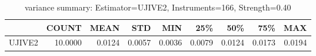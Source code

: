 \begin{table}[ht]
\centering
\caption{variance summary: Estimator=UJIVE2, Instruments=166, Strength=0.40}
\begin{tabular}{lrrrrrrrr}
\toprule
 & COUNT & MEAN & STD & MIN & 25\% & 50\% & 75\% & MAX \\
\midrule
UJIVE2 & 10.0000 & 0.0124 & 0.0057 & 0.0036 & 0.0079 & 0.0124 & 0.0173 & 0.0194 \\
\bottomrule
\end{tabular}
\end{table}

